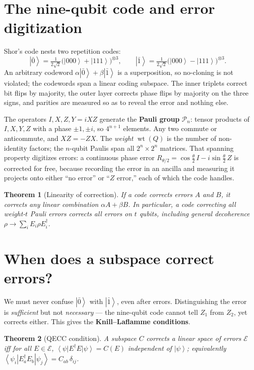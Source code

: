 \documentclass[11pt]{article}
\newcommand{\ket}[1]{\left|#1\right\rangle}
\newcommand{\bra}[1]{\left\langle#1\right|}
\newcommand{\wt}{\operatorname{wt}}
\theoremstyle{plain}
\newtheorem*{theorem*}{Theorem}
\begin{document}
\section{The nine-qubit code and error digitization}
Shor's code nests two repetition codes:
\[ \ket{\bar0} = \tfrac{1}{2\sqrt2}\big(\ket{000}+\ket{111}\big)^{\otimes 3},\qquad
   \ket{\bar1} = \tfrac{1}{2\sqrt2}\big(\ket{000}-\ket{111}\big)^{\otimes 3}. \]
An arbitrary codeword $\alpha\ket{\bar0}+\beta\ket{\bar1}$ is a superposition, so no-cloning is not
violated; the codewords span a linear coding subspace. The inner triplets correct bit flips by
majority, the outer layer corrects phase flips by majority on the three signs, and parities are
measured so as to reveal the error and nothing else.

The operators $I,X,Z,Y=iXZ$ generate the \textbf{Pauli group} $\mathcal P_n$: tensor products of
$I,X,Y,Z$ with a phase $\pm1,\pm i$, so $4^{n+1}$ elements. Any two commute or anticommute, and
$XZ=-ZX$. The \emph{weight} $\wt(Q)$ is the number of non-identity factors; the $n$-qubit Paulis span
all $2^n\times 2^n$ matrices. That spanning property digitizes errors: a continuous phase error
$R_{\theta/2}=\cos\tfrac\theta2\,I - i\sin\tfrac\theta2\,Z$ is corrected for free, because recording
the error in an ancilla and measuring it projects onto either ``no error'' or ``$Z$ error,'' each of
which the code handles.

\begin{theorem*}[Linearity of correction]
If a code corrects errors $A$ and $B$, it corrects any linear combination $\alpha A+\beta B$. In
particular, a code correcting all weight-$t$ Pauli errors corrects all errors on $t$ qubits, including
general decoherence $\rho\to\sum_i E_i\rho E_i^\dagger$.
\end{theorem*}

\section{When does a subspace correct errors?}
We must never confuse $\ket{\bar0}$ with $\ket{\bar1}$, even after errors. Distinguishing the error is
\emph{sufficient} but not \emph{necessary} --- the nine-qubit code cannot tell $Z_1$ from $Z_2$, yet
corrects either. This gives the \textbf{Knill--Laflamme conditions}.

\begin{theorem*}[QECC condition]
A subspace $C$ corrects a linear space of errors $\mathcal E$ iff for all $E\in\mathcal E$,
$\bra{\psi}E^\dagger E\ket{\psi} = C(E)$ independent of $\ket\psi$; equivalently
$\bra{\psi_i}E_a^\dagger E_b\ket{\psi_j} = C_{ab}\,\delta_{ij}$.
\end{theorem*}
\end{document}
